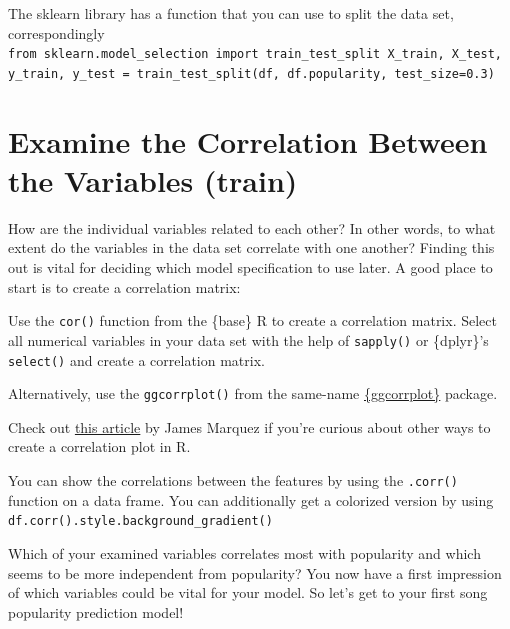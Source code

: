 \documentclass[
  11pt,
]{book}
\newenvironment{tips}[1]
  {
  \begin{itemize}
  \footnotesize
  \renewcommand{\labelitemi}{
    \raisebox{-.7\height}[0pt][0pt]{
      {\setkeys{Gin}{width=3em,keepaspectratio}
        \texttt{[image: images/\#1.png]}}
    }
  }
  \setlength{\fboxsep}{1em}
  \begin{rbox}
  \item
  }
  {
  \end{rbox}
  \end{itemize}
  }
\newenvironment{tipsp}[1]
  {
  \begin{itemize}
  \footnotesize
  \renewcommand{\labelitemi}{
    \raisebox{-.7\height}[0pt][0pt]{
      {\setkeys{Gin}{width=3em,keepaspectratio}
        \texttt{[image: images/\#1.png]}}
    }
  }
  \setlength{\fboxsep}{1em}
  \begin{pbox}
  \item
  }
  {
  \end{pbox}
  \end{itemize}
  }
\begin{document}
\begin{tipsp}p

The sklearn library has a function that you can use to split the data set, correspondingly
\texttt{from\ sklearn.model\_selection\ import\ train\_test\_split\ X\_train,\ X\_test,\ y\_train,\ y\_test\ =\ train\_test\_split(df,\ df.popularity,\ test\_size=0.3)}

\end{tipsp}

\hypertarget{examine-the-correlation-between-the-variables-train}{%
\section{Examine the Correlation Between the Variables (train)}\label{examine-the-correlation-between-the-variables-train}}

How are the individual variables related to each other? In other words, to what extent do the variables in the data set correlate with one another? Finding this out is vital for deciding which model specification to use later. A good place to start is to create a correlation matrix:

\begin{tips}r

Use the \texttt{cor()} function from the \{base\} R to create a correlation matrix. Select all numerical variables in your data set with the help of \texttt{sapply()} or \{dplyr\}'s \texttt{select()} and create a correlation matrix.

Alternatively, use the \texttt{ggcorrplot()} from the same-name \href{https://cran.r-project.org/package=ggcorrplot}{\{ggcorrplot\}} package.

Check out \href{http://jamesmarquezportfolio.com/correlation_matrices_in_r.html}{this article} by James Marquez if you're curious about other ways to create a correlation plot in R.

\end{tips}

\begin{tipsp}p

You can show the correlations between the features by using the \texttt{.corr()} function on a data frame. You can additionally get a colorized version by using \texttt{df.corr().style.background\_gradient()}

\end{tipsp}

Which of your examined variables correlates most with popularity and which seems to be more independent from popularity? You now have a first impression of which variables could be vital for your model. So let's get to your first song popularity prediction model!
\end{document}
